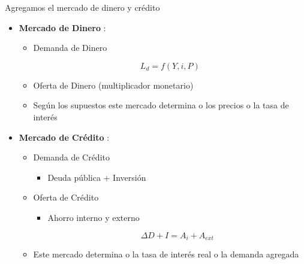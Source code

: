 \documentclass{beamer}
\begin{document}
\begin{frame}{Agregamos el mercado de dinero y crédito}

    \begin{itemize}
        \item \textbf{Mercado de Dinero} \faMoney:
            \begin{itemize}
            \item Demanda de Dinero
            
            \begin{center}
            \begin{tcolorbox}[width=1.5in,
                  interior hidden,
                  boxsep=0pt,
                  left=0pt,
                  right=0pt,
                  top=0pt,
                  ]%
                    $$ L_{d}=f(Y, i, P) $$
             \end{tcolorbox}
             \end{center}
            
            \item Oferta de Dinero (multiplicador monetario)
            \item Según los supuestos este mercado determina o los precios o la tasa de interés
            \end{itemize}
        
        \item \textbf{Mercado de Crédito} \faBank:
            \begin{itemize}
             \item Demanda de Crédito
                \begin{itemize}
                \item Deuda pública + Inversión
                \end{itemize}
              \item Oferta de Crédito
                \begin{itemize}
                \item Ahorro interno y externo

            \begin{center}
            \begin{tcolorbox}[width=2in, boxsep=0pt, left=0pt, right=0pt, top=0pt,]%
                    $$ \Delta D+I=A_{i}+A_{e x t} $$
             \end{tcolorbox}
             \end{center}
                \end{itemize}
            \item Este mercado determina o la tasa de interés real o la demanda agregada
            \end{itemize}
    \end{itemize}

\end{frame}
\end{document}
